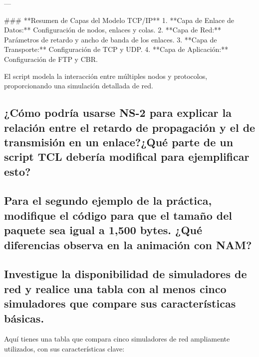 ---

### **Resumen de Capas del Modelo TCP/IP**
1. **Capa de Enlace de Datos:** Configuración de nodos, enlaces y colas.
2. **Capa de Red:** Parámetros de retardo y ancho de banda de los enlaces.
3. **Capa de Transporte:** Configuración de TCP y UDP.
4. **Capa de Aplicación:** Configuración de FTP y CBR.

El script modela la interacción entre múltiples nodos y protocolos, proporcionando una simulación detallada de red.

\subsection*{¿C\'omo podr\'ia usarse NS-2 para explicar la relaci\'on entre el retardo de propagaci\'on y el de transmisi\'on en un
enlace?¿Qu\'e parte de un script TCL deber\'ia modifical para ejemplificar esto?}

\subsection*{Para el segundo ejemplo de la pr\'actica, modifique el c\'odigo para que el tamaño del paquete sea igual a 1,500 bytes.
¿Qu\'e diferencias observa en la animaci\'on con NAM?}

\subsection*{Investigue la disponibilidad de simuladores de red y realice una tabla con al menos cinco simuladores que compare sus
caracter\'isticas b\'asicas.}

Aquí tienes una tabla que compara cinco simuladores de red ampliamente utilizados, con sus características clave:

